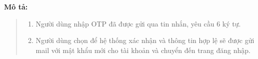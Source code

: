 \textbf{Mô tả:}
\begin{quote}
    \begin{enumerate}
        \item Người dùng nhập OTP đã được gửi qua tin nhắn, yêu cầu 6 ký tự.
        \item Người dùng chọn để hệ thống xác nhận và thông tin hợp lệ sẽ được gửi mail với mật khẩu mới cho tài khoản và chuyển đến trang đăng nhập.
    \end{enumerate}
\end{quote}

